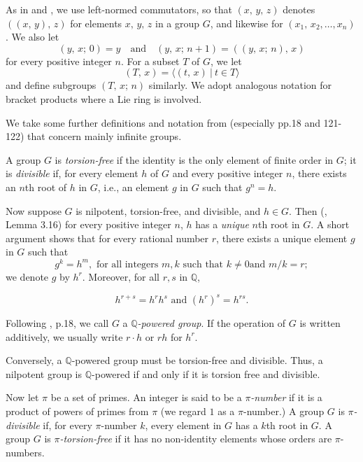 \documentclass[mathscr]{amsart}
\theoremstyle{theorem}
\theoremstyle{definition}
\numberwithin{equation}{section}
\def \({\left(}
\def \){\right)}
\def\Q{\mathbb{Q}}
\begin{document}
As in \cite{Gor} and \cite{Kh}, we use left-normed commutators, so
that $(x,\,y,\,z)$ denotes $((x,\,y),\,z)$ for elements $x,\,y,\,z$
in a group $G$, and likewise for $(x_1,\,x_2,\dots,x_n)$. We also
let
$$(y,\,x;\,0)=y\quad\text{and}\quad (y,\,x;\,n+1)=((y,\,x;\,n),\,x)$$
for every
positive integer $n.$ For a subset $T$ of $G$, we let
$$(T,\,x)=\langle(t,\,x)\ |\ t\in T\rangle$$
and define subgroups $(T,\,x;\,n)$ similarly. We adopt analogous
notation for bracket products where a Lie ring is involved.

We take some further definitions and notation from \cite{Kh}
(especially pp.18 and 121-122) that concern mainly infinite groups.

A group $G$ is {\it torsion-free} if the identity is the only
element of finite order in $G$; it is {\it divisible} if, for every
element $h$ of $G$ and every positive integer $n$, there exists an
$n$th root of $h$ in $G$, i.e., an element $g$ in $G$ such that
$g^n=h$.

Now suppose $G$ is nilpotent, torsion-free, and divisible, and $h\in
G$.  Then (\cite{Kh}, Lemma 3.16) for every positive integer $n$,
$h$ has a {\it unique} $n$th root in $G$.  A short argument shows
that for every rational number $r$, there exists a unique element
$g$ in $G$ such that
\begin{equation}\label{eq1.2}
g^k=h^m, \text{ for all integers }m,k\text{ such that }k\neq 0\text{
and }m/k=r;\end{equation}
we denote $g$ by $h^r$. Moreover, for all
$r,s$ in $\mathbb{Q}$,

\begin{equation}h^{r+s}=h^rh^s\text{ and }\(h^r\)^s=h^{rs}.\label{eq3.3}
\end{equation}

Following \cite{Kh}, p.18, we call $G$ a $\mathbb{Q}${\it -powered
group}. If the operation of $G$ is written additively, we usually
write $r\cdot h$ or $rh$ for $h^r$.

Conversely, a $\mathbb{Q}$-powered group must be torsion-free and
divisible. Thus, a nilpotent group is $\Q$-powered if and only if it
is torsion free and divisible.

Now let $\pi$ be a set of primes.  An integer is said to be a {\it
$\pi$-number} if it is a product of powers of primes from $\pi$ (we
regard $1$ as a $\pi$-number.)  A group $G$ is {\it $\pi$-divisible}
if, for every $\pi$-number $k$, every element in $G$ has a $k$th
root in $G$.  A group $G$ is {\it $\pi$-torsion-free} if it has no
non-identity elements whose orders are $\pi$-numbers.
\end{document}

